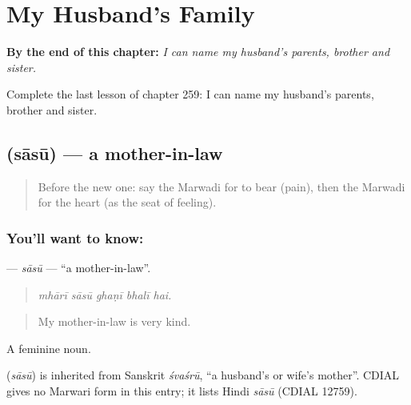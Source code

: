 
\chapter{My Husband's Family}
\label{ch:mw-my-husband-s-family}

\begin{chapteropening}
\textbf{By the end of this chapter:} \emph{I can name my husband's parents, brother and sister.}

Complete the last lesson of chapter 259: I can name my husband's parents, brother and sister.
\end{chapteropening}

\section[\texorpdfstring{\mw{सासू} (sāsū)}{सासू (sāsū)}]{ (sāsū) — a mother-in-law}

\label{lesson:MW-C259-sasu}



\begin{quote}
Before the new one: say the Marwadi for to bear (pain), then the Marwadi for the heart (as the seat of feeling).
\end{quote}

\subsection*{You'll want to know: }
\textbf{} — \emph{sāsū} — \textquotedblleft{}a mother-in-law\textquotedblright{}.

\begin{quote}
    
\end{quote}

\begin{quote}
\emph{mhārī sāsū ghaṇī bhalī hai.}
\end{quote}

\begin{quote}
My mother-in-law is very kind.
\end{quote}

A feminine noun.

\begin{cousinweb}
\textbf{} (\emph{sāsū}) is inherited from Sanskrit \emph{śvaśrū}, \textquotedblleft{}a husband's or wife's mother\textquotedblright{}. CDIAL gives no Marwari form in this entry; it lists Hindi \emph{sāsū} (CDIAL 12759).
\end{cousinweb}

